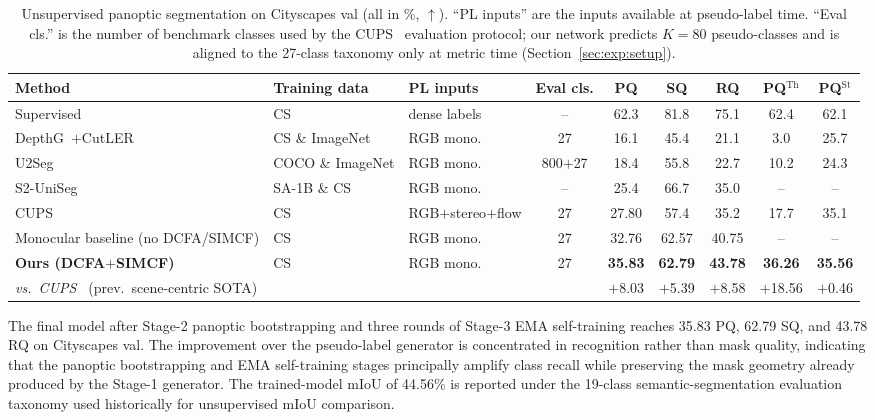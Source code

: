 \documentclass[10pt,twocolumn,letterpaper]{article}
\begin{document}
\begin{table}[t]
\centering
\small
\setlength{\tabcolsep}{3pt}
\begin{tabular}{l l l c c c c c c}
\toprule
Method & Training data & PL inputs & Eval cls. & PQ & SQ & RQ & PQ$^\text{Th}$ & PQ$^\text{St}$ \\
\midrule
\rowcolor{black!5} Supervised~\cite{kirillov2019panoptic} & CS & dense labels & -- & 62.3 & 81.8 & 75.1 & 62.4 & 62.1 \\
\midrule
DepthG~\cite{sick2024depthg}$+$CutLER~\cite{wang2023cutler} & CS \& ImageNet & RGB mono. & 27 & 16.1 & 45.4 & 21.1 & \phantom{0}3.0 & 25.7 \\
U2Seg~\cite{niu2024u2seg} & COCO \& ImageNet & RGB mono. & 800$+$27 & 18.4 & 55.8 & 22.7 & 10.2 & 24.3 \\
S2-UniSeg~\cite{xu2025s2uniseg} & SA-1B \& CS & RGB mono. & -- & 25.4 & 66.7 & 35.0 & -- & -- \\
CUPS~\cite{hahn2025cups} & CS & RGB$+$stereo$+$flow & 27 & 27.80 & 57.4 & 35.2 & 17.7 & 35.1 \\
\midrule
Monocular baseline (no DCFA/SIMCF) & CS & RGB mono. & 27 & 32.76 & 62.57 & 40.75 & -- & -- \\
\textbf{Ours (DCFA$+$SIMCF)} & CS & RGB mono. & 27 & \textbf{35.83} & \textbf{62.79} & \textbf{43.78} & \textbf{36.26} & \textbf{35.56} \\
\midrule
\textit{vs.\ CUPS~\cite{hahn2025cups}} (prev.\ scene-centric SOTA) & & & & \textcolor{green!50!black}{$+$8.03} & \textcolor{green!50!black}{$+$5.39} & \textcolor{green!50!black}{$+$8.58} & \textcolor{green!50!black}{$+$18.56} & \textcolor{green!50!black}{$+$0.46} \\
\bottomrule
\end{tabular}
\caption{Unsupervised panoptic segmentation on Cityscapes val (all in \%, $\uparrow$). ``PL inputs'' are the inputs available at pseudo-label time. ``Eval cls.'' is the number of benchmark classes used by the CUPS~\cite{hahn2025cups} evaluation protocol; our network predicts $K{=}80$ pseudo-classes and is aligned to the 27-class taxonomy only at metric time (Section~\ref{sec:exp:setup}).}
\label{tab:main}
\end{table}

The final model after Stage-2 panoptic bootstrapping and three rounds of Stage-3 EMA self-training reaches 35.83 PQ, 62.79 SQ, and 43.78 RQ on Cityscapes val. The improvement over the pseudo-label generator is concentrated in recognition rather than mask quality, indicating that the panoptic bootstrapping and EMA self-training stages principally amplify class recall while preserving the mask geometry already produced by the Stage-1 generator. The trained-model mIoU of 44.56\% is reported under the 19-class semantic-segmentation evaluation taxonomy used historically for unsupervised mIoU comparison.
\end{document}
